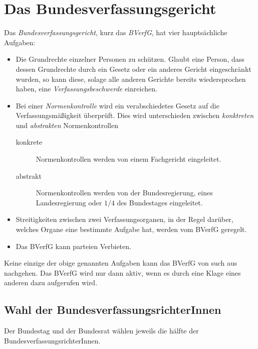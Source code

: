 \documentclass{article}
\begin{document}
\section{Das Bundesverfassungsgericht}
Das \emph{Bundesverfassungsgericht}, kurz das \emph{BVerfG}, hat vier hauptsächliche Aufgaben:
\begin{itemize}
 \item Die Grundrechte einzelner Personen zu schützen. Glaubt eine Person, dass dessen Grundrechte durch ein Gesetz oder ein anderes Gericht eingeschränkt wurden, so kann diese, solage alle anderen Gerichte bereits wiedersprochen haben, eine \emph{Verfassungsbeschwerde} einreichen.
 \item Bei einer \emph{Normenkontrolle} wird ein verabschiedetes Gesetz auf die Verfassungsmäßigkeit überprüft. Dies wird unterschieden zwischen \emph{konktreten} und \emph{abstrakten} Normenkontrollen
 \begin{description}
  \item[konkrete] Normenkontrollen werden von einem Fachgericht eingeleitet.  
  \item[abstrakt] Normenkontrollen werden von der Bundesregierung, eines Landesregierung oder $1/4$ des Bundestages eingeleitet.
 \end{description} 
 \item Streitigkeiten zwischen zwei Verfassungsorganen, in der Regel darüber, welches Organe eine bestimmte Aufgabe hat, werden vom BVerfG geregelt.
 \item Das BVerfG kann parteien Verbieten. 
\end{itemize} 
Keine einzige der obige genannten Aufgaben kann das BVerfG von such aus nachgehen. Das BVerfG wird nur dann aktiv, wenn es durch eine Klage eines anderen dazu aufgerufen wird. 
 
\subsection{Wahl der BundesverfassungsrichterInnen} 
Der Bundestag und der Bundesrat wählen jeweils die hälfte der BundesverfassungsrichterInnen.
 
\end{document}

